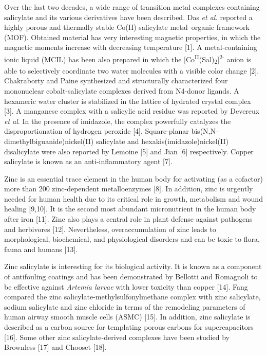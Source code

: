 Over the last two decades, a wide range of transition metal complexes
containing salicylate and its various derivatives have been described.
Das \emph{et al.} reported a highly porous and thermally stable Co(II)
salicylate metal--organic framework (MOF). Obtained material has very
interesting magnetic properties, in which the magnetic moments increase
with decreasing temperature {[}1{]}. A metal-containing ionic liquid
(MCIL) has been also prepared in which the
{[}Co\textsuperscript{II}(Sal)\textsubscript{2}{]}\textsuperscript{2-}
anion is able to selectively coordinate two water molecules with a
visible color change {[}2{]}. Chakraborty and Paine synthesized and
structurally characterized four mononuclear cobalt-salicylate complexes
derived from N4-donor ligands. A hexameric water cluster is stabilized
in the lattice of hydrated crystal complex {[}3{]}. A manganese complex
with a salicylic acid residue was reported by Devereux \emph{et al}. In
the presence of imidazole, the complex powerfully catalyzes the
disproportionation of hydrogen peroxide {[}4{]}. Square-planar
bis(N,N-dimethylbiguanide)nickel(II) salicylate and
hexakis(imidazole)nickel(II) disalicylate were also reported by Lemoine
{[}5{]} and Jian {[}6{]} respectively. Copper salicylate is known as an
anti-inflammatory agent {[}7{]}.

Zinc is an essential trace element in the human body for activating (as
a cofactor) more than 200 zinc-dependent metalloenzymes {[}8{]}. In
addition, zinc is urgently needed for human health due to its critical
role in growth, metabolism and wound healing {[}9,10{]}. It is the
second most abundant micronutrient in the human body after iron
{[}11{]}. Zinc also plays a central role in plant defense against
pathogens and herbivores {[}12{]}. Nevertheless, overaccumulation of
zinc leads to morphological, biochemical, and physiological disorders
and can be toxic to flora, fauna and humans {[}13{]}.

Zinc salicylate is interesting for its biological activity. It is known
as a component of antifouling coatings and has been demonstrated by
Bellotti and Romagnoli to be effective against \emph{Artemia larvae}
with lower toxicity than copper {[}14{]}. Fang compared the zinc
salicylate-methylsulfonylmethane complex with zinc salicylate, sodium
salicylate and zinc chloride in terms of the remodeling parameters of
human airway smooth muscle cells (ASMC) {[}15{]}. In addition, zinc
salicylate is described as a carbon source for templating porous carbons
for supercapacitors {[}16{]}. Some other zinc salicylate-derived
complexes have been studied by Brownless {[}17{]} and Chooset {[}18{]}.

